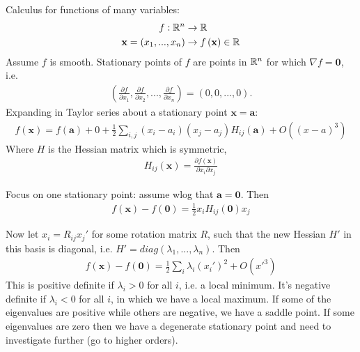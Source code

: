 \documentclass[a4paper]{article}
\begin{document}
Calculus for functions of many variables:
\begin{equation*}
\begin{aligned}
f: \mathbb{R}^n &\to \mathbb{R}\\
\mathbf{x} = \left(x_1,...,x_n\right) &\to f\left(\mathbf{x}\right) \in \mathbb{R}
\end{aligned}
\end{equation*}
Assume $f$ is smooth. Stationary points of $f$ are points in $\mathbb{R}^n$ for which $\nabla f=\mathbf{0}$, i.e.
\begin{equation*}
\begin{aligned}
\left(\frac{\partial f}{\partial x_1},\frac{\partial f}{\partial x_2},...,\frac{\partial f}{\partial x_n}\right) = \left(0,0,...,0\right).
\end{aligned}
\end{equation*}
Expanding in Taylor series about a stationary point $\mathbf{x}=\mathbf{a}$:
\begin{equation*}
\begin{aligned}
f\left(\mathbf{x}\right) = f\left(\mathbf{a}\right) + 0 + \frac{1}{2} \sum_{i,j} \left(x_i-a_i\right)\left(x_j-a_j\right) H_{ij} \left(\mathbf{a}\right) + O\left(\left(x-a\right)^3\right)
\end{aligned}
\end{equation*}
Where $H$ is the Hessian matrix which is symmetric,
\begin{equation*}
\begin{aligned}
H_{ij}\left(\mathbf{x}\right) = \frac{\partial f\left(\mathbf{x}\right)}{\partial x_i \partial x_j}
\end{aligned}
\end{equation*}

Focus on one stationary point: assume wlog that $\mathbf{a}=\mathbf{0}$. Then
\begin{equation*}
\begin{aligned}
f\left(\mathbf{x}\right) - f\left(\mathbf{0}\right) = \frac{1}{2}x_i H_{ij}\left(\mathbf{0}\right) x_j
\end{aligned}
\end{equation*}

Now let $x_i=R_{ij} x_j'$ for some rotation matrix $R$, such that the new Hessian $H'$ in this basis is diagonal, i.e. $H' = diag \left(\lambda_1,...,\lambda_n\right)$. Then
\begin{equation*}
\begin{aligned}
f\left(\mathbf{x}\right) - f\left(\mathbf{0}\right) = \frac{1}{2}\sum_i \lambda_i \left(x_i'\right)^2 + O\left(x'^3\right)
\end{aligned}
\end{equation*}
This is positive definite if $\lambda_i>0$ for all $i$, i.e. a local minimum. It's negative definite if $\lambda_i<0$ for all $i$, in which we have a local maximum. If some of the eigenvalues are positive while others are negative, we have a saddle point. If some eigenvalues are zero then we have a degenerate stationary point and need to investigate further (go to higher orders).
\end{document}
